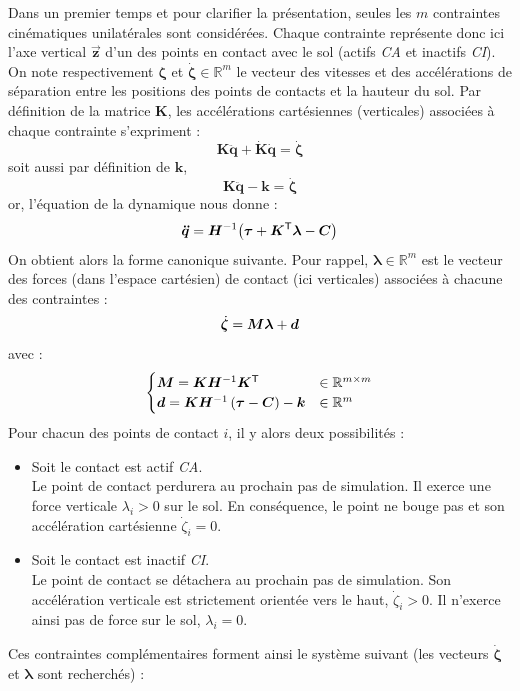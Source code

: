 Dans un premier temps et pour clarifier la présentation, seules 
les $m$ contraintes cinématiques unilatérales sont considérées.
Chaque contrainte représente donc ici l'axe vertical $\bm{\vec{z}}$ 
d'un des points en contact avec le sol (actifs \textit{CA} et inactifs \textit{CI}).
On note respectivement $\bm{\zeta}$ et $\bm{\dot{\zeta}} \in \mathbb{R}^{m}$
le vecteur des vitesses et des accélérations de séparation entre les positions 
des points de contacts et la hauteur du sol.
Par définition de la matrice $\bm{K}$, les accélérations cartésiennes (verticales) 
associées à chaque contrainte s'expriment :
$$
\bm{K}\bm{\ddot{q}} + \bm{\dot{K}}\bm{\dot{q}} = \bm{\dot{\zeta}}
$$
soit aussi par définition de $\bm{k}$,
$$
\bm{K}\bm{\ddot{q}} - \bm{k} = \bm{\dot{\zeta}}
$$
or, l'équation de la dynamique nous donne :
$$
\bm{\ddot{q}} = 
\bm{H}^{-1}\big(\bm{\tau} + \bm{K}^{\mathsf{T}}\bm{\lambda} - \bm{C}\big)
$$
On obtient alors la forme canonique suivante.
Pour rappel, $\bm{\lambda} \in \mathbb{R}^{m}$ est le vecteur des
forces (dans l'espace cartésien) de contact (ici verticales) associées
à chacune des contraintes :
$$
\dot{\bm{\zeta}} = \bm{M}\bm{\lambda} + \bm{d} \\
$$
avec :
$$
\begin{cases}
\bm{M} = \bm{K}\bm{H}^{-1}\bm{K}^{\mathsf{T}} & \in \mathbb{R}^{m \times m}\\
\bm{d} = \bm{K}\bm{H}^{-1}\left(\bm{\tau} - \bm{C}\right) - \bm{k} & \in \mathbb{R}^{m}\\
\end{cases}
$$
Pour chacun des points de contact $i$, il y alors deux possibilités :
\begin{itemize}
    \item Soit le contact est actif \textit{CA}.\\
    Le point de contact perdurera au prochain pas de simulation.
    Il exerce une force verticale $\lambda_{i} > 0$ sur le sol.
    En conséquence, le point ne bouge pas et son accélération cartésienne $\dot{\zeta}_{i} = 0$.
    \item Soit le contact est inactif \textit{CI}.\\
    Le point de contact se détachera au prochain pas de simulation.
    Son accélération verticale est strictement orientée vers le haut, $\dot{\zeta}_{i} > 0$.
    Il n'exerce ainsi pas de force sur le sol, $\lambda_{i} = 0$.
\end{itemize}
Ces contraintes complémentaires forment ainsi le système suivant
(les vecteurs $\bm{\dot{\zeta}}$ et $\bm{\lambda}$ sont recherchés) :
